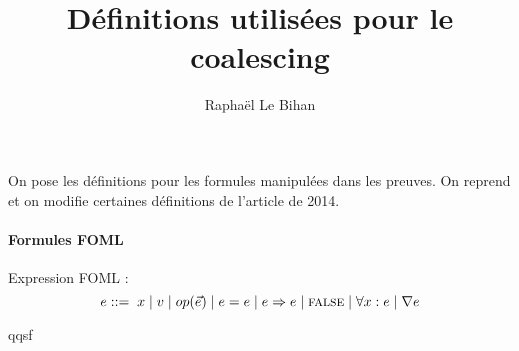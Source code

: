 \documentclass[12pt]{article}
\title{Définitions utilisées pour le coalescing}
\author{Raphaël Le Bihan}
\newcommand{\FALSE}{\textsc{false}}
\begin{document}
\maketitle

On pose les définitions pour les formules manipulées dans les preuves. On reprend et on modifie certaines définitions de l'article de 2014.

\paragraph{Formules FOML}

Expression FOML :
\[ e ::= \; x \; | \; v \; | \; op(\vec{e}) \; | \; e = e \; | \; e \Rightarrow e \; | \; \FALSE \; | \; \forall x : e \; | \; \nabla e \]

\vspace{15pt}
qqsf
\end{document}
